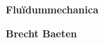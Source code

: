 \null
\thispagestyle{empty}

\vspace{5cm}

{\fontsize{46}{46}\selectfont \textbf{Fluïdummechanica} }

\vspace{1cm}
\textbf{\huge{Brecht Baeten}}
\clearpage

